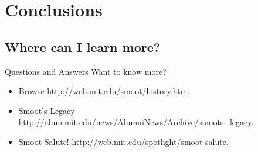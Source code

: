 \documentclass{beamer}
\begin{document}
\section{Conclusions}
\subsection{Where can I learn more?}
\begin{frame}{Questions and Answers}
  Want to know more?

  \begin{itemize}
    \item Browse \url{http://web.mit.edu/smoot/history.htm}.
    \item Smoot's Legacy \url{http://alum.mit.edu/news/AlumniNews/Archive/smoots_legacy}.
    \item Smoot Salute! \url{http://web.mit.edu/spotlight/smoot-salute}.
  \end{itemize}
  
\end{frame}
\end{document}
